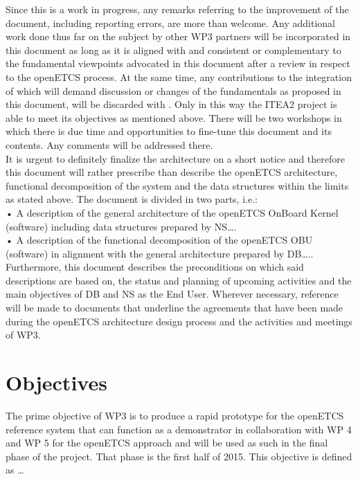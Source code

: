 \documentclass{template/openetcs_report}
\begin{document}
Since this is a work in progress, any remarks referring to the improvement of the document, including reporting errors, are more than welcome. Any additional work done thus far on the subject by other WP3 partners will be incorporated in this document as long as it is aligned with and consistent or complementary  to the fundamental viewpoints advocated in this document after a review in respect to the openETCS process. At the same time, any contributions to the  integration of which will demand discussion or changes of the fundamentals as proposed in this document, will be discarded with . Only in this way the ITEA2 project is able to meet its objectives as mentioned above. There will be two workshops in which there is due time and opportunities to fine-tune this document and its contents. Any comments will be addressed there.\\

It is urgent to definitely finalize the architecture on a short notice and therefore this document will rather prescribe than describe the openETCS architecture, functional decomposition of the system and the data structures within the limits as stated above. The document is divided in two parts, i.e.:\\
•	A description of the general architecture of the openETCS OnBoard Kernel (software) including data structures prepared by NS….\\
•	A description of the functional decomposition of the openETCS OBU (software) in alignment with the general architecture prepared by DB…..\\


Furthermore, this document describes the preconditions on which said descriptions are based on, the status and planning of upcoming activities and the main objectives of DB and NS as the End User. Wherever necessary, reference will be made to documents that underline the agreements that have been made during the openETCS architecture design process and the activities and meetings of WP3. \\


\section{Objectives}

The prime objective of WP3 is to produce a rapid prototype for the openETCS reference system that can function as a demonstrator in collaboration with WP 4 and WP 5  for the openETCS approach and will be used as such in the final phase of the project. That phase is the first half of 2015.  This objective is defined as … 
\end{document}
